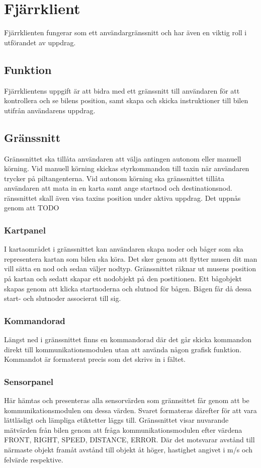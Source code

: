 \documentclass[tekniskrapport/tech.tex]{subfiles}
\begin{document}
\section{Fjärrklient}
Fjärrklienten fungerar som ett användargränssnitt och har även en
viktig roll i utförandet av uppdrag.

\subsection{Funktion}
Fjärrklientens uppgift är att bidra med ett gränssnitt till användaren för att
kontrollera och se bilens position, samt skapa och skicka instruktioner till
bilen utifrån användarens uppdrag.

\subsection{Gränssnitt}
Gränssnittet ska tillåta användaren att välja antingen autonom eller manuell
körning. Vid manuell körning skickas styrkommandon till taxin när användaren
trycker på piltangenterna. Vid autonom körning ska gränssnittet tillåta
användaren att mata in en karta samt ange startnod och destinationsnod.
ränssnittet skall även visa taxins position under aktiva uppdrag. Det uppnås
genom att TODO

\subsubsection{Kartpanel}
I kartaområdet i gränssnittet kan användaren skapa noder och båger som ska
representera kartan som bilen ska köra. Det sker genom att flytter musen dit
man vill sätta en nod och sedan väljer nodtyp. Gränssnittet räknar
ut musens position på kartan och sedatt skapar ett nodobjekt på den postitionen.
Ett bågobjekt skapas genom att klicka startnoderna och slutnod för bågen.
Bågen får då dessa start- och slutnoder associerat till sig.

\subsubsection{Kommandorad}
Längst ned i gränssnittet finns en kommandorad där det går skicka kommandon
direkt till kommunikationsmodulen utan att använda någon grafisk funktion.
Kommandot är formaterat precis som det skrivs in i fältet.

\subsubsection{Sensorpanel}
Här hämtas och presenteras alla sensorvärden som grännsittet får genom att be
kommunikationsmodulen om dessa värden. Svaret formateras därefter för att vara
lättläsligt och lämpliga etiktetter läggs till.  Gränssnittet visar nuvarande
mätvärden från bilen genom att fråga kommunikationsmodulen efter värdena FRONT,
RIGHT, SPEED, DISTANCE, ERROR. Där det motsvarar avstånd till närmaste objekt
framåt avstånd till objekt åt höger, hastighet angivet i m/s och felvärde
respektive. 
\end{document}
